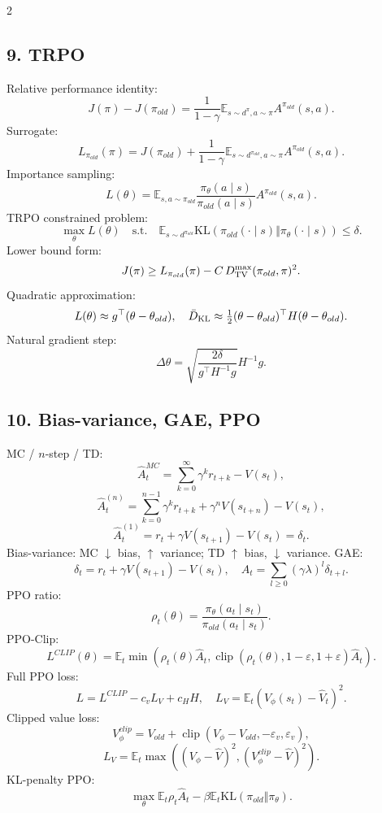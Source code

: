\documentclass[8pt,a4paper]{extarticle}
\newcommand{\E}{\mathbb E}
\newcommand{\KL}{\mathrm{KL}}
\newcommand{\clip}{\operatorname{clip}}
\newcommand{\1}{\mathbf 1}
\begin{document}
\begin{multicols*}{2}
\subsection*{9. TRPO}
Relative performance identity:
\[
J(\pi)-J(\pi_{old})=\frac1{1-\gamma}\E_{s\sim d^\pi,a\sim\pi}A^{\pi_{old}}(s,a).
\]
Surrogate:
\[
L_{\pi_{old}}(\pi)=J(\pi_{old})+\frac1{1-\gamma}\E_{s\sim d^{\pi_{old}},a\sim\pi}A^{\pi_{old}}(s,a).
\]
Importance sampling:
\[
L(\theta)=\E_{s,a\sim\pi_{old}}\frac{\pi_\theta(a\mid s)}{\pi_{old}(a\mid s)}A^{\pi_{old}}(s,a).
\]
TRPO constrained problem:
\[
\max_\theta L(\theta)
\quad\text{s.t.}\quad
\E_{s\sim d^{\pi_{old}}}\KL(\pi_{old}(\cdot\mid s)\Vert\pi_\theta(\cdot\mid s))\le \delta.
\]
Lower bound form:
\[
J(\pi)\ge L_{\pi_{old}}(\pi)-C\,D_{\rm TV}^{\max}(\pi_{old},\pi)^2.
\]
Quadratic approximation:
\[
L(\theta)\approx g^\top(\theta-\theta_{old}),
\quad \bar D_{\rm KL}\approx \tfrac12(\theta-\theta_{old})^\top H(\theta-\theta_{old}).
\]
Natural gradient step:
\[
\Delta\theta=\sqrt{\frac{2\delta}{g^\top H^{-1}g}}H^{-1}g.
\]

\subsection*{10. Bias-variance, GAE, PPO}
MC / $n$-step / TD:
\[
\hat A_t^{MC}=\sum_{k=0}^{\infty}\gamma^k r_{t+k}-V(s_t),
\]
\[
\hat A_t^{(n)}=\sum_{k=0}^{n-1}\gamma^k r_{t+k}+\gamma^nV(s_{t+n})-V(s_t),
\]
\[
\hat A_t^{(1)}=r_t+\gamma V(s_{t+1})-V(s_t)=\delta_t.
\]
Bias-variance: MC $\downarrow$ bias, $\uparrow$ variance; TD $\uparrow$ bias, $\downarrow$ variance.
GAE:
\[
\delta_t=r_t+\gamma V(s_{t+1})-V(s_t),
\quad
\hat A_t=\sum_{l\ge0}(\gamma\lambda)^l\delta_{t+l}.
\]
PPO ratio:
\[
\rho_t(\theta)=\frac{\pi_\theta(a_t\mid s_t)}{\pi_{old}(a_t\mid s_t)}.
\]
PPO-Clip:
\[
L^{CLIP}(\theta)=\E_t\min\left(\rho_t(\theta)\hat A_t,
\clip(\rho_t(\theta),1-\varepsilon,1+\varepsilon)\hat A_t\right).
\]
Full PPO loss:
\[
L=L^{CLIP}-c_v L_V+c_H H,
\quad
L_V=\E_t(V_\phi(s_t)-\hat V_t)^2.
\]
Clipped value loss:
\[
V_\phi^{clip}=V_{old}+\clip(V_\phi-V_{old},-\varepsilon_v,\varepsilon_v),
\]
\[
L_V=\E_t\max\left((V_\phi-\hat V)^2,(V_\phi^{clip}-\hat V)^2\right).
\]
KL-penalty PPO:
\[
\max_\theta \E_t\rho_t\hat A_t-\beta\E_t\KL(\pi_{old}\Vert\pi_\theta).
\]


\end{multicols*}
\end{document}
